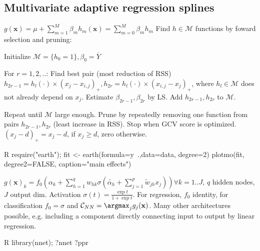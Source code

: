 \subsection{Multivariate adaptive regression splines}%
\label{sub:multivariate_adaptive_regression_splines}
\begin{sectionbox}[MARS]\nospacing{}
  $g(\mathbf{x}) = \mu + \sum_{m=1}^{M}\beta_m h_m(\mathbf{x}) = \sum_{m=0}^{M}\beta_m h_m $
  Find $h \in \mathcal{M}$ functions by foward selection and pruning:

  \begin{enumeratenosep}[label=\roman*]
    \item Initialize $\mathcal{M} = \{ h_0 = 1\}, \beta_0 = \overline{Y}$
    \item For $r=1,2,..$: Find best pair (most reduction of RSS) $h_{2r-1}=h_l(\cdot)\times(x_j-x_{i,j})_{+}, h_{2r}=h_l(\cdot)\times(x_{i,j}-x_j)_{+}$, where $h_l \in \mathcal{M}$ does not already depend on $x_j$. Estimate $\beta_{2r-1}, \beta_{2r}$ by LS. Add $h_{2r-1}, h_{2r}$ to $\mathcal{M}$.
    \item Repeat until $\mathcal{M}$ large enough. Prune by repeatedly removing one function from pairs $h_{2r-1}, h_{2r}$ (least increase in RSS). Stop when GCV score is optimized.
      $(x_j-d)_{+} = x_j-d$, if $x_j \geq d$, zero otherwise.
  \end{enumeratenosep}
  \begin{mintlinebox}{R}
    require("earth"); 
    fit <- earth(formula=y~.,data=data, degree=2)
    plotmo(fit, degree2=FALSE, caption="main effects")
  \end{mintlinebox}
\end{sectionbox}	

\begin{sectionbox}\nospacing{}
  $g(\mathbf{x})_k = f_0(\alpha_k + \sum_{h=1}^{q}w_{hk}\sigma(\tilde{\alpha_h} + \sum_{j=1}^{p}\tilde{w}_{jh}x_j)) \forall k=1..J$, $q$ hidden nodes, $J$ output dim. Activation $\sigma(t) = \frac{\exp t}{1 + \exp t}$. For regression, $f_0$ identity, for classification $f_0 = \sigma$ and $\mathcal{C}_{NN} = \argmax_{j} g_j(\mathbf{x})$. Many other architectures possible, e.g. including a component directly connecting input to output by linear regression.
  \begin{mintlinebox}{R}
    library(nnet); ?nnet ?ppr 
  \end{mintlinebox}
\end{sectionbox}

